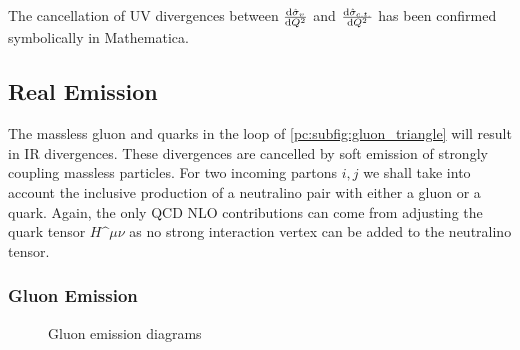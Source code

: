 \documentclass[../main.tex]{subfiles}
\begin{document}
The cancellation of UV divergences between \(\d[Q^2]{\hat\sigma_v}\) and \(\d[Q^2]{\hat\sigma_{c.t.}}\) has been confirmed symbolically in Mathematica.


\subsection{Real Emission}

The massless gluon and quarks in the loop of \cref{pc:subfig:gluon_triangle} will result in IR divergences.
These divergences are cancelled by soft emission of strongly coupling massless particles.
For two incoming partons \(i, j\) we shall take into account the inclusive production of a neutralino pair with either a gluon or a quark.
Again, the only QCD NLO contributions can come from adjusting the quark tensor \(H\^{\mu\nu}\) as no strong interaction vertex can be added to the neutralino tensor.

\subsubsection*{Gluon Emission}
\begin{figure}[ht!]
  \centering
  \begin{subfigure}{0.49\textwidth}
    \centering
    \caption{}
    \label{pc:subfig:gluon_emission_t}
  \end{subfigure}
  \begin{subfigure}{0.49\textwidth}
    \centering
    \caption{}
    \label{pc:subfig:gluon_emission_u}
  \end{subfigure}
  \caption{Gluon emission diagrams}
  \label{pc:fig:gluon_emission}
\end{figure}
\end{document}
